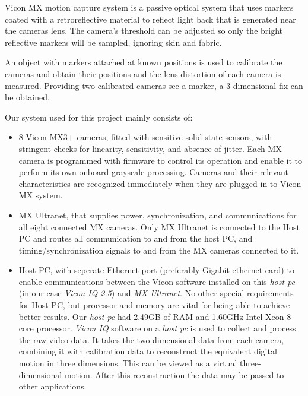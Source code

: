 

Vicon MX motion capture system is a passive optical system that uses markers
coated with a retroreflective material to reflect light back that is generated near the cameras lens.
The camera's threshold can be adjusted so only the bright reflective markers will be sampled, ignoring skin and fabric.

An object with markers attached at known positions is used to calibrate the cameras and obtain their positions and the lens distortion of each camera is measured. Providing two calibrated cameras see a marker, a 3 dimensional fix can be obtained.

Our system used for this project mainly consists of:

\begin{itemize}
\item 8 Vicon MX3+ cameras, fitted with sensitive solid-state
sensors, with stringent checks for linearity, sensitivity, and absence of jitter.
Each MX camera is programmed with firmware to control its operation
and enable it to perform its own onboard grayscale processing.
Cameras and their relevant characteristics are recognized immediately when they are plugged in to Vicon MX system.

\item MX Ultranet, that supplies power, synchronization, and
communications for all eight connected MX cameras. Only MX Ultranet is connected to the Host PC
and routes all communication to and from the host PC, and timing/synchronization signals to and from the
MX cameras connected to it.

\item Host PC, with seperate Ethernet port (preferably Gigabit ethernet card) to enable communications between
the Vicon software installed on this \emph{host pc} (in our case \emph{Vicon IQ 2.5}) and \emph{MX Ultranet}.
No other special requirements for Host PC, but processor and memory are vital for being able to achieve better results. Our \emph{host pc} had 2.49GB of RAM and 1.60GHz Intel Xeon 8 core processor.
\emph{Vicon IQ} software on a \emph{host pc} is used to collect
and process the raw video data. It takes the two-dimensional data from each
camera, combining it with calibration data to reconstruct the equivalent digital
motion in three dimensions. This can be viewed as a virtual
three-dimensional motion. After this reconstruction the data may be passed to
other applications.
\end{itemize}


